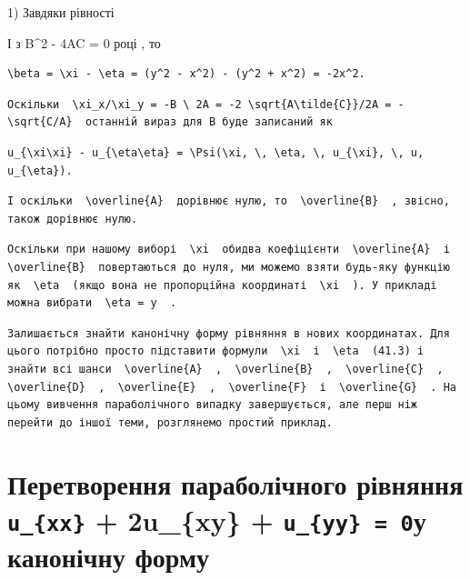 \documentclass[
  ukrainian,
]{article}
\begin{document}
1) Завдяки рівності

І з B\^{}2 - 4AC = 0 році , то

\begin{verbatim}
\beta = \xi - \eta = (y^2 - x^2) - (y^2 + x^2) = -2x^2.
\end{verbatim}

\begin{verbatim}
Оскільки  \xi_x/\xi_y = -B \ 2A = -2 \sqrt{A\tilde{C}}/2A = -\sqrt{C/A}  останній вираз для B буде записаний як
\end{verbatim}

\begin{verbatim}
u_{\xi\xi} - u_{\eta\eta} = \Psi(\xi, \, \eta, \, u_{\xi}, \, u, u_{\eta}).
\end{verbatim}

\begin{verbatim}
І оскільки  \overline{A}  дорівнює нулю, то  \overline{B}  , звісно, також дорівнює нулю.
\end{verbatim}

\begin{verbatim}
Оскільки при нашому виборі  \xi  обидва коефіцієнти  \overline{A}  і  \overline{B}  повертаються до нуля, ми можемо взяти будь-яку функцію як  \eta  (якщо вона не пропорційна координаті  \xi  ). У прикладі можна вибрати  \eta = y  .
\end{verbatim}

\begin{verbatim}
Залишається знайти канонічну форму рівняння в нових координатах. Для цього потрібно просто підставити формули  \xi  і  \eta  (41.3) і знайти всі шанси  \overline{A}  ,  \overline{B}  ,  \overline{C}  ,  \overline{D}  ,  \overline{E}  ,  \overline{F}  і  \overline{G}  . На цьому вивчення параболічного випадку завершується, але перш ніж перейти до іншої теми, розглянемо простий приклад.
\end{verbatim}

\section{\texorpdfstring{Перетворення параболічного рівняння
\texttt{u\_\{xx\}} + 2u\_\{xy\} + \texttt{u\_\{yy\}\ =\ 0}у канонічну
форму}{Перетворення параболічного рівняння u\_\{xx\} + 2u\_\{xy\} + u\_\{yy\} = 0у канонічну форму}}\label{ux43fux435ux440ux435ux442ux432ux43eux440ux435ux43dux43dux44f-ux43fux430ux440ux430ux431ux43eux43bux456ux447ux43dux43eux433ux43e-ux440ux456ux432ux43dux44fux43dux43dux44f-u_xx-2u_xy-u_yy-0ux443-ux43aux430ux43dux43eux43dux456ux447ux43dux443-ux444ux43eux440ux43cux443}
\end{document}
